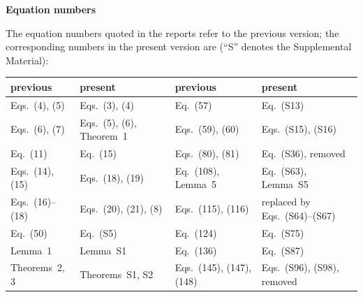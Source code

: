 \documentclass[11pt]{article}
\begin{document}
\newpage


\noindent\textbf{\large Equation numbers}

\medskip

\noindent The equation numbers quoted in the reports refer to the previous version; the corresponding numbers in the present version are (``S'' denotes the Supplemental Material):

\begin{center}
\small
\begin{tabular}{ll|ll}
\hline
previous & present & previous & present\\
\hline
Eqs.~(4), (5) & Eqs.~(3), (4) & Eq.~(57) & Eq.~(S13)\\
Eqs.~(6), (7) & Eqs.~(5), (6), Theorem~1 & Eqs.~(59), (60) & Eqs.~(S15), (S16)\\
Eq.~(11) & Eq.~(15) & Eqs.~(80), (81) & Eq.~(S36), removed\\
Eqs.~(14), (15) & Eqs.~(18), (19) & Eq.~(108), Lemma~5 & Eq.~(S63), Lemma~S5\\
Eqs.~(16)--(18) & Eqs.~(20), (21), (8) & Eqs.~(115), (116) & replaced by Eqs.~(S64)--(S67)\\
Eq.~(50) & Eq.~(S5) & Eq.~(124) & Eq.~(S75)\\
Lemma~1 & Lemma~S1 & Eq.~(136) & Eq.~(S87)\\
Theorems~2, 3 & Theorems~S1, S2 & Eqs.~(145), (147), (148) & Eqs.~(S96), (S98), removed\\
\hline
\end{tabular}
\end{center}
\end{document}
